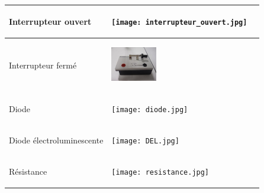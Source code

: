 \documentclass[11pt]{article}
\begin{document}
\begin{center}
\begin{tabular}{ |p{6cm}|p{6cm}|p{6cm}|  }
			Interrupteur ouvert 		&
			\begin{minipage}{.3\textwidth}
				\begin{center}
					\texttt{[image: interrupteur\_ouvert.jpg]}
				\end{center}
			  \end{minipage}  &  \\\hline
			Interrupteur fermé 			&  
			\begin{minipage}{.3\textwidth}
				\begin{center}
					\includegraphics[width=2cm]{interrupteur_fermé.jpg}
				\end{center}
			  \end{minipage}  &  \\\hline
			Diode 						&  
			\begin{minipage}{.3\textwidth}
				\begin{center}
					\texttt{[image: diode.jpg]}
				\end{center}
			  \end{minipage}  &  \\\hline
			Diode électroluminescente 	&  
			\begin{minipage}{.3\textwidth}
				\begin{center}
					\texttt{[image: DEL.jpg]}
				\end{center}
			  \end{minipage}  &  \\\hline
			Résistance 					&  
			\begin{minipage}{.3\textwidth}
				\begin{center}
					\texttt{[image: resistance.jpg]}
				\end{center}
			  \end{minipage}  &  \\\hline
			
			\end{tabular}
		\end{center}
\end{document}
